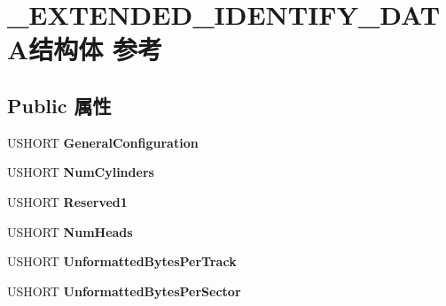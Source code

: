 \hypertarget{struct___e_x_t_e_n_d_e_d___i_d_e_n_t_i_f_y___d_a_t_a}{}\section{\+\_\+\+E\+X\+T\+E\+N\+D\+E\+D\+\_\+\+I\+D\+E\+N\+T\+I\+F\+Y\+\_\+\+D\+A\+T\+A结构体 参考}
\label{struct___e_x_t_e_n_d_e_d___i_d_e_n_t_i_f_y___d_a_t_a}
\subsection*{Public 属性}
\begin{DoxyCompactItemize}
\item 
\mbox{\label{struct___e_x_t_e_n_d_e_d___i_d_e_n_t_i_f_y___d_a_t_a_a0899bd20ac56b96bb6161864eaffa3a3}} 
U\+S\+H\+O\+RT {\bfseries General\+Configuration}
\item 
\mbox{\label{struct___e_x_t_e_n_d_e_d___i_d_e_n_t_i_f_y___d_a_t_a_a8edf5e5238232f3501fab550ef93ee7b}} 
U\+S\+H\+O\+RT {\bfseries Num\+Cylinders}
\item 
\mbox{\label{struct___e_x_t_e_n_d_e_d___i_d_e_n_t_i_f_y___d_a_t_a_aac84d93f8c778bc1c542f59dd064c471}} 
U\+S\+H\+O\+RT {\bfseries Reserved1}
\item 
\mbox{\label{struct___e_x_t_e_n_d_e_d___i_d_e_n_t_i_f_y___d_a_t_a_a286f3a4f99e39be1323aa87f4f070c85}} 
U\+S\+H\+O\+RT {\bfseries Num\+Heads}
\item 
\mbox{\label{struct___e_x_t_e_n_d_e_d___i_d_e_n_t_i_f_y___d_a_t_a_aa776eebc4151ccd4202f368277433e64}} 
U\+S\+H\+O\+RT {\bfseries Unformatted\+Bytes\+Per\+Track}
\item 
\mbox{\label{struct___e_x_t_e_n_d_e_d___i_d_e_n_t_i_f_y___d_a_t_a_af2eb98842d6bd08040323680ab68368b}} 
U\+S\+H\+O\+RT {\bfseries Unformatted\+Bytes\+Per\+Sector}
\item 

\end{DoxyCompactItemize}
